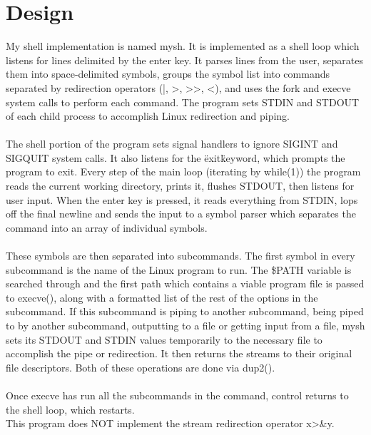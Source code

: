 \documentclass[11pt]{article}
\begin{document}
\section{Design}
My shell implementation is named mysh. It is implemented as a shell loop which listens for lines delimited by the enter key. It parses lines from the user, 
separates them into space-delimited symbols, groups the symbol list into commands separated by redirection operators (|, >, >>, <), and uses the fork and execve
system calls to perform each command. The program sets STDIN and STDOUT of each child process to accomplish Linux redirection and piping.\\ \\
The shell portion of the program sets signal handlers to ignore SIGINT and SIGQUIT system calls. It also listens for the \"exit\" keyword, which prompts the 
program to exit. Every step of the main loop (iterating by while(1)) the program reads the current working directory, prints it, flushes STDOUT, then listens for
user input. When the enter key is pressed, it reads everything from STDIN, lops off the final newline and sends the input to a symbol parser which separates the
command into an array of individual symbols. \\ \\
These symbols are then separated into subcommands. The first symbol in every subcommand is the name of the Linux program to run. The \${PATH} variable is searched
through and the first path which contains a viable program file is passed to execve(), along with a formatted list of the rest of the options in the subcommand.
If this subcommand is piping to another subcommand, being piped to by another subcommand, outputting to a file or getting input from a file, mysh sets its 
STDOUT and STDIN values temporarily to the necessary file to accomplish the pipe or redirection. It then returns the streams to their original file descriptors.
Both of these operations are done via dup2(). \\ \\
Once execve has run all the subcommands in the command, control returns to the shell loop, which restarts. \\
This program does NOT implement the stream redirection operator x>\&y. 
\end{document}

